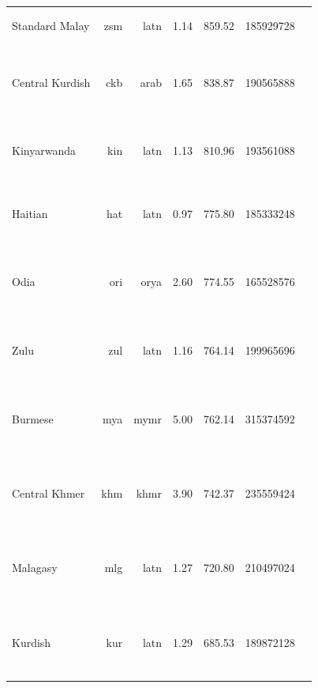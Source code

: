 \documentclass[11pt]{article}
\begin{document}
\begin{center}
\begin{longtable}[width=0.9\textwidth]{|lrrrrrl|}
Standard Malay & zsm & latn & 1.14 & 859.52 & 185929728 & {\color{nllb}\rule{3.65cm}{8pt}}{\color{glot500}\rule{0.3500000000000001cm}{8pt}} \\ 
Central Kurdish & ckb & arab & 1.65 & 838.87 & 190565888 & {\color{oscar}\rule{0.61cm}{8pt}}{\color{nllb}\rule{0.77cm}{8pt}}{\color{madlad400}\rule{1.76cm}{8pt}}{\color{glot500}\rule{0.7cm}{8pt}}{\color{other}\rule{0.16000000000000014cm}{8pt}} \\ 
Kinyarwanda & kin & latn & 1.13 & 810.96 & 193561088 & {\color{nllb}\rule{1.12cm}{8pt}}{\color{madlad400}\rule{2.44cm}{8pt}}{\color{glot500}\rule{0.32cm}{8pt}}{\color{other}\rule{0.1200000000000001cm}{8pt}} \\ 
Haitian & hat & latn & 0.97 & 775.80 & 185333248 & {\color{nllb}\rule{0.74cm}{8pt}}{\color{madlad400}\rule{1.43cm}{8pt}}{\color{glot500}\rule{1.73cm}{8pt}}{\color{other}\rule{0.10000000000000009cm}{8pt}} \\ 
Odia & ori & orya & 2.60 & 774.55 & 165528576 & {\color{oscar}\rule{0.33cm}{8pt}}{\color{nllb}\rule{1.07cm}{8pt}}{\color{madlad400}\rule{0.75cm}{8pt}}{\color{glot500}\rule{1.77cm}{8pt}}{\color{other}\rule{0.07999999999999963cm}{8pt}} \\ 
Zulu & zul & latn & 1.16 & 764.14 & 199965696 & {\color{nllb}\rule{1.39cm}{8pt}}{\color{madlad400}\rule{0.69cm}{8pt}}{\color{glot500}\rule{1.88cm}{8pt}}{\color{other}\rule{0.040000000000000036cm}{8pt}} \\ 
Burmese & mya & mymr & 5.00 & 762.14 & 315374592 & {\color{oscar}\rule{0.49cm}{8pt}}{\color{nllb}\rule{0.58cm}{8pt}}{\color{madlad400}\rule{2.27cm}{8pt}}{\color{glot500}\rule{0.47cm}{8pt}}{\color{other}\rule{0.1900000000000004cm}{8pt}} \\ 
Central Khmer & khm & khmr & 3.90 & 742.37 & 235559424 & {\color{oscar}\rule{0.63cm}{8pt}}{\color{nllb}\rule{0.82cm}{8pt}}{\color{madlad400}\rule{2.22cm}{8pt}}{\color{glot500}\rule{0.25cm}{8pt}}{\color{other}\rule{0.08000000000000007cm}{8pt}} \\ 
Malagasy & mlg & latn & 1.27 & 720.80 & 210497024 & {\color{oscar}\rule{0.09cm}{8pt}}{\color{nllb}\rule{1.09cm}{8pt}}{\color{madlad400}\rule{1.32cm}{8pt}}{\color{glot500}\rule{1.39cm}{8pt}}{\color{other}\rule{0.11000000000000032cm}{8pt}} \\ 
Kurdish & kur & latn & 1.29 & 685.53 & 189872128 & {\color{oscar}\rule{0.33cm}{8pt}}{\color{nllb}\rule{0.17cm}{8pt}}{\color{madlad400}\rule{2.86cm}{8pt}}{\color{glot500}\rule{0.54cm}{8pt}}{\color{other}\rule{0.10000000000000009cm}{8pt}} \\ 

\end{longtable}
\end{center}
\end{document}
